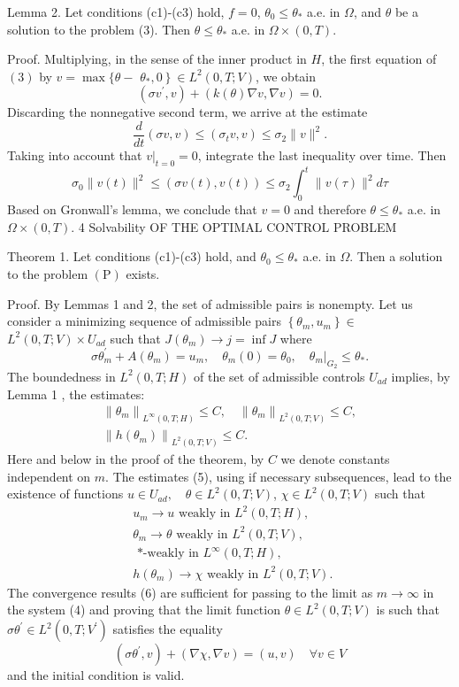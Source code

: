 \documentclass[10pt]{article}
\begin{document}
Lemma 2. Let conditions (c1)-(c3) hold, $f=0$, $\theta_{0} \leq \theta_{*}$ a.e. in $\Omega$, and $\theta$ be a solution to the problem (3). Then $\theta \leq \theta_{*}$ a.e. in $\Omega \times(0, T)$.

Proof. Multiplying, in the sense of the inner product in $H$, the first equation of $(3)$ by $v=\max \{\theta-$ $\left.\theta_{*}, 0\right\} \in L^{2}(0, T ; V)$, we obtain
$$
\left(\sigma v^{\prime}, v\right)+(k(\theta) \nabla v, \nabla v)=0 .
$$
Discarding the nonnegative second term, we arrive at the estimate
$$
\frac{d}{d t}(\sigma v, v) \leq\left(\sigma_{t} v, v\right) \leq \sigma_{2}\|v\|^{2} .
$$
Taking into account that $\left.v\right|_{t=0}=0$, integrate the last inequality over time. Then
$$
\sigma_{0}\|v(t)\|^{2} \leq(\sigma v(t), v(t)) \leq \sigma_{2} \int_{0}^{t}\|v(\tau)\|^{2} d \tau
$$
Based on Gronwall's lemma, we conclude that $v=0$ and therefore $\theta \leq \theta_{*}$ a.e. in $\Omega \times(0, T)$. 4 Solvability OF THE OPTIMAL CONTROL PROBLEM

Theorem 1. Let conditions (c1)-(c3) hold, and $\theta_{0} \leq \theta_{*}$ a.e. in $\Omega$. Then a solution to the problem $(\mathrm{P})$ exists.

Proof. By Lemmas 1 and 2, the set of admissible pairs is nonempty. Let us consider a minimizing sequence of admissible pairs $\left\{\theta_{m}, u_{m}\right\} \in$ $L^{2}(0, T ; V) \times U_{a d}$ such that $J\left(\theta_{m}\right) \rightarrow j=\inf J$ where
$$
\sigma \theta_{m}^{\prime}+A\left(\theta_{m}\right)=u_{m}, \quad \theta_{m}(0)=\theta_{0},\left.\quad \theta_{m}\right|_{G_{2}} \leq \theta_{*} .
$$
The boundedness in $L^{2}(0, T ; H)$ of the set of admissible controls $U_{a d}$ implies, by Lemma 1 , the estimates:
$$
\begin{gathered}
\left\|\theta_{m}\right\|_{L^{\infty}(0, T ; H)} \leq C, \quad\left\|\theta_{m}\right\|_{L^{2}(0, T ; V)} \leq C, \\
\left\|h\left(\theta_{m}\right)\right\|_{L^{2}(0, T ; V)} \leq C .
\end{gathered}
$$
Here and below in the proof of the theorem, by $C$ we denote constants independent on $m$. The estimates (5), using if necessary subsequences, lead to the existence of functions $u \in U_{a d}, \quad \theta \in L^{2}(0, T ; V)$, $\chi \in L^{2}(0, T ; V)$ such that
$$
\begin{aligned}
& u_{m} \rightarrow u \text { weakly in } L^{2}(0, T ; H), \\
& \theta_{m} \rightarrow \theta \text { weakly in } L^{2}(0, T ; V) \text {, } \\
& \text { *-weakly in } L^{\infty}(0, T ; H) \text {, } \\
& h\left(\theta_{m}\right) \rightarrow \chi \text { weakly in } L^{2}(0, T ; V) \text {. }
\end{aligned}
$$
The convergence results (6) are sufficient for passing to the limit as $m \rightarrow \infty$ in the system (4) and proving that the limit function $\theta \in L^{2}(0, T ; V)$ is such that $\sigma \theta^{\prime} \in L^{2}\left(0, T ; V^{\prime}\right)$ satisfies the equality
$$
\left(\sigma \theta^{\prime}, v\right)+(\nabla \chi, \nabla v)=(u, v) \quad \forall v \in V
$$
and the initial condition is valid.
\end{document}
